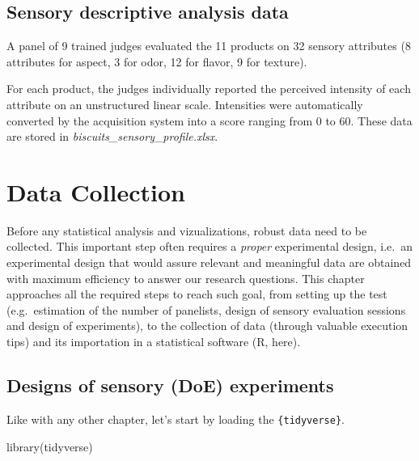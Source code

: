 \documentclass[
]{krantz}
\makeatletter
\newenvironment{Shaded}{\begin{snugshade}}{\end{snugshade}}
\newcommand{\FunctionTok}[1]{\textcolor[rgb]{0,0,0}{#1}}
\newcommand{\NormalTok}[1]{#1}
\renewenvironment{quote}{\begin{VF}}{\end{VF}}
\newenvironment{kframe}{%
\medskip{}
\setlength{\fboxsep}{.8em}
 \def\at@end@of@kframe{}%
 \ifinner\ifhmode%
  \def\at@end@of@kframe{\end{minipage}}%
  \begin{minipage}{\columnwidth}%
 \fi\fi%
 \def\FrameCommand##1{\hskip\@totalleftmargin \hskip-\fboxsep
 \colorbox{shadecolor}{##1}\hskip-\fboxsep
     \hskip-\linewidth \hskip-\@totalleftmargin \hskip\columnwidth}%
 \MakeFramed {\advance\hsize-\width
   \@totalleftmargin\z@ \linewidth\hsize
   \@setminipage}}%
 {\par\unskip\endMakeFramed%
 \at@end@of@kframe}
\renewenvironment{Shaded}{\begin{kframe}}{\end{kframe}}
\makeatother
\begin{document}
\hypertarget{sensory-descriptive-analysis-data}{%
\section{Sensory descriptive analysis data}\label{sensory-descriptive-analysis-data}}

A panel of 9 trained judges evaluated the 11 products on 32 sensory attributes (8 attributes for aspect, 3 for odor, 12 for flavor, 9 for texture).

For each product, the judges individually reported the perceived intensity of each attribute on an unstructured linear scale. Intensities were automatically converted by the acquisition system into a score ranging from 0 to 60. These data are stored in \emph{biscuits\_sensory\_profile.xlsx}.

\hypertarget{data-collection}{%
\chapter{Data Collection}\label{data-collection}}

\begin{quote}
Before any statistical analysis and vizualizations, robust data need to be collected. This important step often requires a \emph{proper} experimental design, i.e.~an experimental design that would assure relevant and meaningful data are obtained with maximum efficiency to answer our research questions. This chapter approaches all the required steps to reach such goal, from setting up the test (e.g.~estimation of the number of panelists, design of sensory evaluation sessions and design of experiments), to the collection of data (through valuable execution tips) and its importation in a statistical software (R, here).
\end{quote}

\hypertarget{designs-of-sensory-doe-experiments}{%
\section{Designs of sensory (DoE) experiments}\label{designs-of-sensory-doe-experiments}}

Like with any other chapter, let's start by loading the \texttt{\{tidyverse\}}.

\begin{Shaded}
\begin{Highlighting}[]
\FunctionTok{library}\NormalTok{(tidyverse)}
\end{Highlighting}
\end{Shaded}
\end{document}
